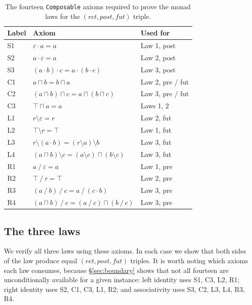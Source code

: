 \documentclass[acmsmall,screen]{acmart}
\newcommand{\post}{\mathit{post}}
\newcommand{\fut}{\mathit{fut}}
\newcommand{\ret}{\mathit{ret}}
\newcommand{\lquot}{\mathbin{\setminus}}   %
\newcommand{\rquot}{\mathbin{/}}           %
\begin{document}
\begin{table}[ht]
\caption{The fourteen \lstinline{Composable} axioms required to prove the
         monad laws for the $(\ret, \post, \fut)$ triple.}
\label{tab:axioms}
\small
\begin{tabular}{lll}
\toprule
Label & Axiom & Used for \\
\midrule
S1 & $\varepsilon \cdot a = a$ & Law 1, post \\
S2 & $a \cdot \varepsilon = a$ & Law 2, post \\
S3 & $(a \cdot b) \cdot c = a \cdot (b \cdot c)$ & Law 3, post \\
\midrule
C1 & $a \sqcap b = b \sqcap a$ & Law 2, pre / fut \\
C2 & $(a \sqcap b) \sqcap c = a \sqcap (b \sqcap c)$ & Law 3, pre / fut \\
C3 & $\top \sqcap a = a$ & Laws 1, 2 \\
\midrule
L1 & $r \lquot \varepsilon = r$ & Law 2, fut \\
L2 & $\top \lquot r = \top$ & Law 1, fut \\
L3 & $r \lquot (a \cdot b) = (r \lquot a) \lquot b$ & Law 3, fut \\
L4 & $(a \sqcap b) \lquot c = (a \lquot c) \sqcap (b \lquot c)$ & Law 3, fut \\
\midrule
R1 & $a \rquot \varepsilon = a$ & Law 1, pre \\
R2 & $\top \rquot r = \top$ & Law 2, pre \\
R3 & $(a \rquot b) \rquot c = a \rquot (c \cdot b)$ & Law 3, pre \\
R4 & $(a \sqcap b) \rquot c = (a \rquot c) \sqcap (b \rquot c)$ & Law 3, pre \\
\bottomrule
\end{tabular}
\end{table}

\subsection{The three laws}
\label{sec:three-laws}

We verify all three laws using these axioms.
In each case we show that both sides of the law produce equal
$(\ret, \post, \fut)$ triples.
It is worth noting which axioms each law consumes, because
\S\ref{sec:boundary} shows that not all fourteen are unconditionally
available for a given instance:
left identity uses S1, C3, L2, R1;
right identity uses S2, C1, C3, L1, R2;
and associativity uses S3, C2, L3, L4, R3, R4.
\end{document}
